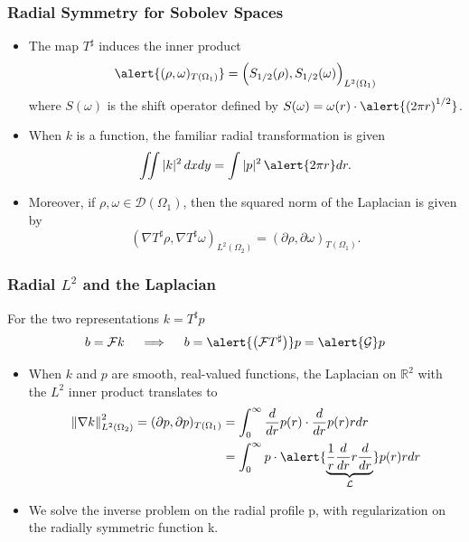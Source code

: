 \documentclass[]{beamer}
\newcommand{\RR}{\ensuremath{\mathbb R}}  %
\newcommand{\DD}{\ensuremath{\mathscr D}}
\newcommand{\ds}{\displaystyle}
\renewcommand{\bar}{\overline}
\newcommand{\del}{\partial}
\begin{document}
\begin{frame}[t]
  \frametitle{Radial Symmetry for Sobolev Spaces}
  \begin{itemize}
    \itemsep 1.2em
    \item The map $T^\sharp$ induces the inner product 
    $$
    \alert{(\rho,\omega)_{T(\Omega_1)}} = \Big( S_{1/2}(\rho),S_{1/2}(\omega) \Big)_{L^2(\Omega_1)}  %
    $$ 
    where $S(\omega)$ is the \alert{shift operator} defined by $S(\omega) = \omega(r)\cdot\alert{\left(2\pi r\right)^{1/2}}$.
    \item When $k$ is a function, the familiar radial transformation is given
    $$
      \iint |k|^2\,dxdy = \int |p|^2 \,\alert{2\pi r}dr.
    $$
    \item Moreover, if $\rho,\omega \in \DD(\Omega_1)$, then \alert{the squared norm of the Laplacian} is given by 
    $$
      (\nabla T^\sharp \rho, \nabla T^\sharp \omega)_{L^2(\Omega_2)} = (\del \rho,\del \omega)_{T(\Omega_1)}.
    $$
  \end{itemize}
\end{frame}

\begin{frame}
  \frametitle{Radial $L^2$ and the Laplacian}
  {\footnotesize For the two representations $k = T^\sharp p$}
  \begin{equation*}
   b= \mathcal F k \quad \implies\quad  b =  \alert{\left(\mathcal F T^\sharp\right)} p = \alert{\mathcal G} p 
  \end{equation*}
  {\footnotesize
  \begin{itemize}
    \itemsep 1.2em
    \item When $k$ and $p$ are smooth, real-valued functions, the Laplacian on $\RR^2$  with the $L^2$ inner product translates to
    \begin{align*}
       \left\|\nabla k\right\|_{L^2(\Omega_2)}^2 
        = (\del p,\del p)_{T(\Omega_1)} 
        &= \int_0^\infty \frac{d}{dr} p(r)\cdot \frac{d}{dr} p(r) rdr\\
        &= \int_0^\infty p \cdot \alert{\underbrace{\frac 1r \frac{d}{dr}r \frac{d}{dr}}_{\mathcal L} }p(r) rdr
    \end{align*}
    \item We solve the inverse problem on the \alert{radial profile p}, with regularization on the \alert{radially symmetric function k}.
  \end{itemize}
  }
\end{frame}
\end{document}
